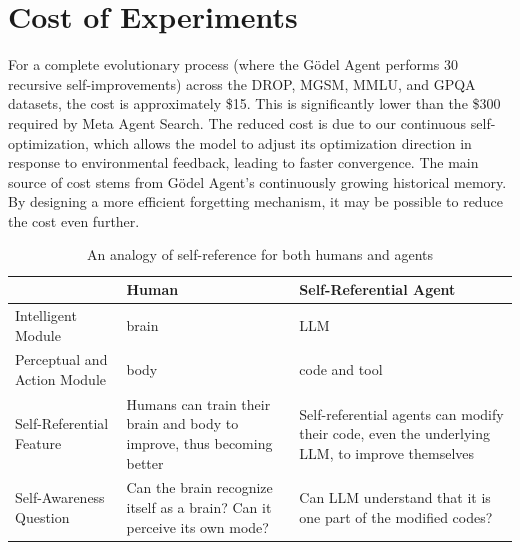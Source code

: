 \documentclass[11pt]{article}
\newcommand{\framework}{Gödel Agent\xspace}
\begin{document}
\section{Cost of Experiments}

\label{sec:cost}
For a complete evolutionary process (where the \framework performs 30 recursive self-improvements) across the DROP, MGSM, MMLU, and GPQA datasets, the cost is approximately \$15. This is significantly lower than the \$300 required by Meta Agent Search. The reduced cost is due to our continuous self-optimization, which allows the model to adjust its optimization direction in response to environmental feedback, leading to faster convergence.
The main source of cost stems from \framework's continuously growing historical memory. By designing a more efficient forgetting mechanism, it may be possible to reduce the cost even further.


% 
\label{sec:future}
\label{app:future}

\begin{table}[t]
\centering

\begin{tabularx}{\textwidth}{@{}lL L@{}} %
\toprule
                          & \textbf{Human}                                                                         & \textbf{Self-Referential Agent}                                                                 \\ \midrule
Intelligent Module        & brain                                                                                  & LLM                                                                                             \\
Perceptual and Action Module    & body                                                                                   & code and tool                                                                                   \\
Self-Referential Feature  & Humans can train their brain and body to improve, thus becoming better                 & Self-referential agents can modify their code, even the underlying LLM, to improve themselves \\
Self-Awareness Question           & Can the brain recognize itself as a brain? Can it perceive its own mode?               & Can LLM understand that it is one part of the modified codes?                               \\ \bottomrule
\end{tabularx}
\caption{An analogy of self-reference for both humans and agents}
\label{tab:self_reference_analogy}
\end{table}
\end{document}
